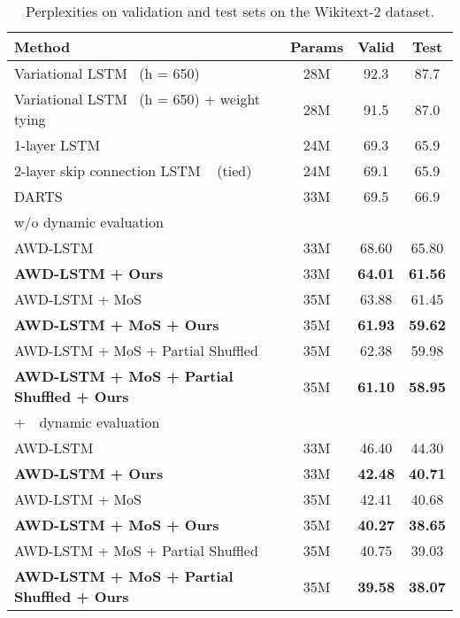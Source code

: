 \documentclass{article}
\begin{document}
\begin{table*}[ht]
\begin{center}
    \setlength{\tabcolsep}{1.2em}
        \begin{tabular}{l|c||cc}
            \toprule
            Method & \bf Params & Valid & Test\\
            \hline
            Variational LSTM~\cite{inan2016tying} (h = 650)  &28M &92.3& 87.7\\
			Variational LSTM~\cite{inan2016tying} (h = 650) + weight tying &28M& 91.5& 87.0\\
1-layer LSTM~\cite{mandt2017stochastic} &24M& 69.3 &65.9\\
			2-layer skip connection LSTM ~\cite{mandt2017stochastic} (tied) &24M &69.1& 65.9\\
			DARTS~\cite{liu2018darts} & 33M & 69.5 & 66.9 \\
			\hline
\hline
\multicolumn{4}{l}{w/o dynamic evaluation} \\
            \hline
            AWD-LSTM ~\citep{merity2017regularizing} & 33M & 68.60 & 65.80\\
           \bf{AWD-LSTM + Ours} & 33M & \bf{64.01} & \bf{61.56}\\
            AWD-LSTM + MoS \citep{yang2017breaking} & 35M & 63.88 & 61.45 \\
            \bf AWD-LSTM + MoS + Ours & 35M & \bf{61.93} & \bf{59.62} \\
            AWD-LSTM + MoS + Partial Shuffled \citep{press2019partially} & 35M & 62.38 & 59.98 \\
            \bf AWD-LSTM + MoS + Partial Shuffled + Ours & 35M & \bf{61.10} & \bf{58.95} \\
            \hline
            \multicolumn{4}{l}{+~~dynamic evaluation \citep{krause2017dynamic}} \\ 
            \hline
             AWD-LSTM ~\citep{merity2017regularizing}  & 33M & 46.40 & 44.30\\
            \bf{AWD-LSTM + Ours}  & 33M & \bf{42.48} & \bf{40.71}\\
            AWD-LSTM + MoS \citep{yang2017breaking}  & 35M & 42.41 & 40.68 \\
            \bf AWD-LSTM + MoS + Ours  & 35M & \bf{40.27} & \bf{38.65} \\
            AWD-LSTM + MoS + Partial Shuffled \citep{press2019partially} & 35M & 40.75 & 39.03 \\
            \bf AWD-LSTM + MoS + Partial Shuffled + Ours & 35M & \bf 39.58 & \bf 38.07 \\
            \bottomrule
        \end{tabular}
    \end{center}
\caption{\label{WT2-table} Perplexities on validation and test sets on the Wikitext-2 dataset.} 
\end{table*}
\end{document}
